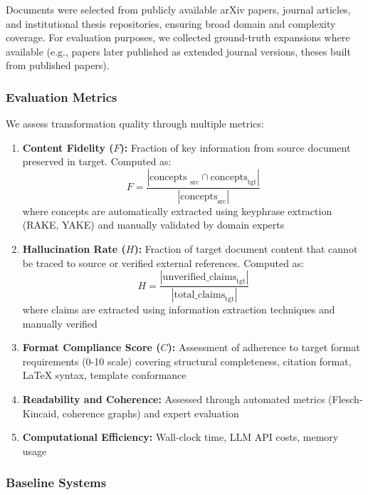 \documentclass{ieeeaccess}
\begin{document}
Documents were selected from publicly available arXiv papers, journal articles, and institutional thesis repositories, ensuring broad domain and complexity coverage. For evaluation purposes, we collected ground-truth expansions where available (e.g., papers later published as extended journal versions, theses built from published papers).

\subsubsection{Evaluation Metrics}

We assess transformation quality through multiple metrics:

\begin{enumerate}
\item \textbf{Content Fidelity (\(F\)):} Fraction of key information from source document preserved in target. Computed as:
\begin{equation}
F = \frac{|\text{concepts }_{\text{src}} \cap \text{concepts}_{\text{tgt}}|}{|\text{concepts}_{\text{src}}|}
\end{equation}
where concepts are automatically extracted using keyphrase extraction (RAKE, YAKE) and manually validated by domain experts

\item \textbf{Hallucination Rate (\(H\)):} Fraction of target document content that cannot be traced to source or verified external references. Computed as:
\begin{equation}
H = \frac{|\text{unverified\_claims}_{\text{tgt}}|}{|\text{total\_claims}_{\text{tgt}}|}
\end{equation}
where claims are extracted using information extraction techniques and manually verified

\item \textbf{Format Compliance Score (\(C\)):} Assessment of adherence to target format requirements (0-10 scale) covering structural completeness, citation format, LaTeX syntax, template conformance

\item \textbf{Readability and Coherence:} Assessed through automated metrics (Flesch-Kincaid, coherence graphs) and expert evaluation

\item \textbf{Computational Efficiency:} Wall-clock time, LLM API costs, memory usage
\end{enumerate}

\subsubsection{Baseline Systems}
\end{document}
